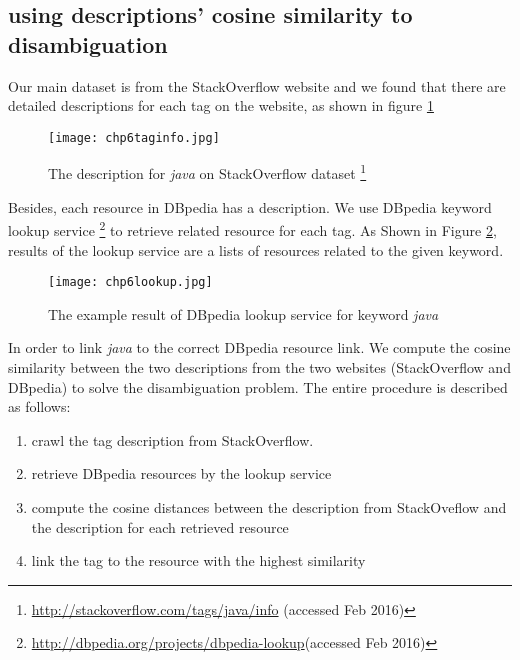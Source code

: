 \subsection{using descriptions' cosine similarity to disambiguation}
Our main dataset is from the StackOverflow website and we found that there are detailed descriptions for each tag on the website, as shown in figure \ref{fig:chp6taginfo}
\begin{figure}[htp]
\centering
\texttt{[image: chp6taginfo.jpg]}  
\caption{The description for \textit{java} on StackOverflow dataset \footnote{\url{http://stackoverflow.com/tags/java/info} (accessed Feb 2016)}}
\label{fig:chp6taginfo} 
\end{figure}

Besides, each resource in DBpedia has a description.  We use DBpedia keyword lookup service \footnote{\url{http://dbpedia.org/projects/dbpedia-lookup}(accessed Feb 2016)} to retrieve related resource for each tag. As Shown in Figure \ref{fig:chp6lookup}, results of the lookup service are a lists of resources related to the given keyword.

\begin{figure}[htp]
\centering
\texttt{[image: chp6lookup.jpg]}  
\caption{The example result of DBpedia lookup service for keyword \textit{java}}
\label{fig:chp6lookup} 
\end{figure}

In order to link \textit{java} to the correct DBpedia resource link. We compute the cosine similarity between the two descriptions from the two websites (StackOverflow and DBpedia) to solve the disambiguation problem. The  entire procedure is described as follows:

\begin{enumerate}
    \item{crawl the tag description from StackOverflow.}
    \item{retrieve DBpedia resources by the lookup service  }
    \item{compute the cosine distances between the description from StackOveflow and the description for each retrieved resource}
    \item{link the tag to the resource with the highest similarity}
\end{enumerate}


